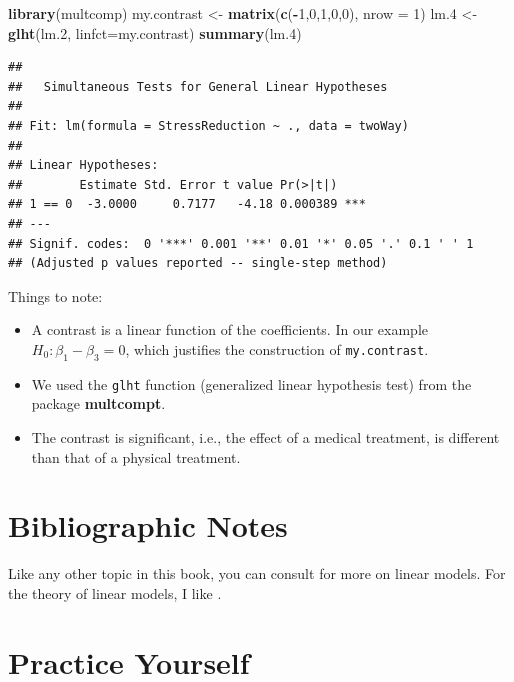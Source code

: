 \documentclass[]{book}
\newenvironment{Shaded}{\begin{snugshade}}{\end{snugshade}}
\newcommand{\KeywordTok}[1]{\textcolor[rgb]{0.13,0.29,0.53}{\textbf{#1}}}
\newcommand{\DataTypeTok}[1]{\textcolor[rgb]{0.13,0.29,0.53}{#1}}
\newcommand{\DecValTok}[1]{\textcolor[rgb]{0.00,0.00,0.81}{#1}}
\newcommand{\StringTok}[1]{\textcolor[rgb]{0.31,0.60,0.02}{#1}}
\newcommand{\OperatorTok}[1]{\textcolor[rgb]{0.81,0.36,0.00}{\textbf{#1}}}
\newcommand{\NormalTok}[1]{#1}
\providecommand{\tightlist}{%
  \setlength{\itemsep}{0pt}\setlength{\parskip}{0pt}}
\theoremstyle{definition}
\theoremstyle{definition}
\theoremstyle{definition}
\theoremstyle{remark}
\begin{document}
\begin{Shaded}
\begin{Highlighting}[]
\KeywordTok{library}\NormalTok{(multcomp)}
\NormalTok{my.contrast <-}\StringTok{ }\KeywordTok{matrix}\NormalTok{(}\KeywordTok{c}\NormalTok{(}\OperatorTok{-}\DecValTok{1}\NormalTok{,}\DecValTok{0}\NormalTok{,}\DecValTok{1}\NormalTok{,}\DecValTok{0}\NormalTok{,}\DecValTok{0}\NormalTok{), }\DataTypeTok{nrow =}  \DecValTok{1}\NormalTok{)}
\NormalTok{lm.}\DecValTok{4}\NormalTok{ <-}\StringTok{ }\KeywordTok{glht}\NormalTok{(lm.}\DecValTok{2}\NormalTok{, }\DataTypeTok{linfct=}\NormalTok{my.contrast)}
\KeywordTok{summary}\NormalTok{(lm.}\DecValTok{4}\NormalTok{)}
\end{Highlighting}
\end{Shaded}

\begin{verbatim}
## 
##   Simultaneous Tests for General Linear Hypotheses
## 
## Fit: lm(formula = StressReduction ~ ., data = twoWay)
## 
## Linear Hypotheses:
##        Estimate Std. Error t value Pr(>|t|)    
## 1 == 0  -3.0000     0.7177   -4.18 0.000389 ***
## ---
## Signif. codes:  0 '***' 0.001 '**' 0.01 '*' 0.05 '.' 0.1 ' ' 1
## (Adjusted p values reported -- single-step method)
\end{verbatim}

Things to note:

\begin{itemize}
\tightlist
\item
  A contrast is a linear function of the coefficients. In our example
  \(H_0:\beta_1-\beta_3=0\), which justifies the construction of
  \texttt{my.contrast}.
\item
  We used the \texttt{glht} function (generalized linear hypothesis
  test) from the package \textbf{multcompt}.
\item
  The contrast is significant, i.e., the effect of a medical treatment,
  is different than that of a physical treatment.
\end{itemize}

\section{Bibliographic Notes}\label{bibliographic-notes-4}

Like any other topic in this book, you can consult
\citet{venables2013modern} for more on linear models. For the theory of
linear models, I like \citet{greene2003econometric}.

\section{Practice Yourself}\label{practice-yourself-3}
\end{document}
